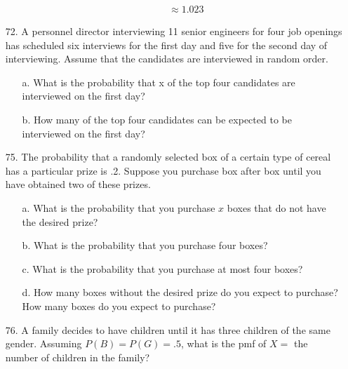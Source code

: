 \documentclass[letterpaper,12pt]{article}
\begin{document}
\begin{enumerate}
\begin{enumerate}
\begin{align*}
          &\approx 1.023
        \end{align*}
    \end{enumerate}
  \item[72.]
    A personnel director interviewing 11 senior engineers for four job openings has scheduled six interviews for the first day and five for the second day of interviewing. Assume that the candidates are interviewed in random order.
    \begin{enumerate}
      \item[a.]
        What is the probability that x of the top four candidates are interviewed on the first day?
      \item[b.]
        How many of the top four candidates can be expected to be interviewed on the first day?
    \end{enumerate}
  \item[75.]
    The probability that a randomly selected box of a certain type of cereal has a particular prize is .2. Suppose you purchase box after box until you have obtained two of these prizes.
    \begin{enumerate}
      \item[a.]
        What is the probability that you purchase $x$ boxes that do not have the desired prize?
      \item[b.]
        What is the probability that you purchase four boxes?
      \item[c.]
        What is the probability that you purchase at most four boxes?
      \item[d.]
        How many boxes without the desired prize do you expect to purchase? How many boxes do you expect to purchase?
    \end{enumerate}
  \item[76.]
    A family decides to have children until it has three children of the same gender. Assuming $P(B) = P(G) = .5$, what is the pmf of $X =$ the number of children in the family?
\end{enumerate}
\end{document}
